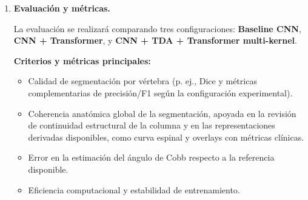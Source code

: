 \documentclass[8pt,a4paper]{article}
\begin{document}
\begin{enumerate}[leftmargin=0.8cm,label=\arabic*.,itemsep=0.85em]
    El proyecto contempla los principios de privacidad, equidad, transparencia y uso responsable en contexto médico:
    \begin{itemize}[leftmargin=0.6cm,itemsep=0.2em]
        \item \textbf{Privacidad y seguridad.} Las radiografías están anonimizadas y su uso se limita al entorno académico/investigativo. La gestión de artefactos y experimentos se realizará sobre infraestructura controlada, con acceso restringido a los datos y trazabilidad de las ejecuciones.
        \item \textbf{Sesgos y representatividad.} Existe desbalance entre estudios normales y estudios con escoliosis, así como variabilidad potencial en calidad de imagen y severidad de la deformidad. Para mitigar este riesgo se evaluarán pérdidas ponderadas, monitoreo por subgrupos y análisis desagregado del desempeño.
        \item \textbf{Transparencia.} El sistema se concibe como soporte a la decisión clínica. Se priorizará la visualización de la segmentación, de la línea central estimada y de los elementos anatómicos utilizados en el cálculo del ángulo de Cobb para facilitar auditoría técnica por parte del especialista.
        \item \textbf{Impacto social.} La propuesta no busca sustituir al profesional de salud, sino reducir carga operativa, apoyar el seguimiento y ampliar acceso a herramientas de análisis en contextos con menor disponibilidad de especialistas.
    \end{itemize}


 \item \textbf{Evaluación y métricas.}

    La evaluación se realizará comparando tres configuraciones: \textbf{Baseline CNN}, \textbf{CNN + Transformer}, y \textbf{CNN + TDA + Transformer multi-kernel}.

    \textbf{Criterios y métricas principales:}
    \begin{itemize}[leftmargin=0.6cm]
        \item Calidad de segmentación por vértebra (p. ej., Dice y métricas complementarias de precisión/F1 según la configuración experimental).
        \item Coherencia anatómica global de la segmentación, apoyada en la revisión de continuidad estructural de la columna y en las representaciones derivadas disponibles, como curva espinal y overlays con métricas clínicas.
        \item Error en la estimación del ángulo de Cobb respecto a la referencia disponible.
        \item Eficiencia computacional y estabilidad de entrenamiento.
    \end{itemize}


\end{enumerate}
\end{document}
